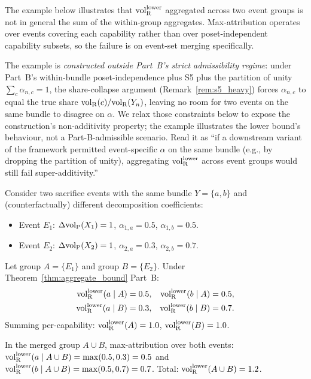 \begin{example}
\label{ex:m6_fail_volRlower}
The example below illustrates that ${\operatorname{vol}_{\mathrm{R}}^{\mathrm{lower}}}$ aggregated
across two event groups is not in general the sum of the
within-group aggregates.  Max-attribution operates over events
covering each capability rather than over poset-independent
capability subsets, so the failure is on event-set merging
specifically.

The example is \emph{constructed outside Part~B's strict
admissibility regime}: under Part~B's within-bundle
poset-independence plus S5 plus the partition of unity
$\sum_c \alpha_{n,c} = 1$, the share-collapse argument
(Remark~\ref{rem:s5_heavy}) forces $\alpha_{n,c}$ to equal the
true share ${\operatorname{vol}_{\mathrm{R}}}(c)/{\operatorname{vol}_{\mathrm{R}}}(Y_n)$, leaving no room for two
events on the same bundle to disagree on $\alpha$.  We relax
those constraints below to expose the construction's
non-additivity property; the example illustrates the lower
bound's behaviour, not a Part-B-admissible scenario.  Read it
as ``if a downstream variant of the framework permitted
event-specific $\alpha$ on the same bundle (e.g., by dropping
the partition of unity), aggregating ${\operatorname{vol}_{\mathrm{R}}^{\mathrm{lower}}}$ across event
groups would still fail super-additivity.''

Consider two sacrifice events with the same bundle
$Y = \{a, b\}$ and (counterfactually) different decomposition
coefficients:
\begin{itemize}
\item Event $E_1$: $\Delta{\operatorname{vol}_{\mathrm{P}}}(X_1) = 1$, $\alpha_{1,a} = 0.5$,
  $\alpha_{1,b} = 0.5$.
\item Event $E_2$: $\Delta{\operatorname{vol}_{\mathrm{P}}}(X_2) = 1$, $\alpha_{2,a} = 0.3$,
  $\alpha_{2,b} = 0.7$.
\end{itemize}
Let group $A = \{E_1\}$ and group $B = \{E_2\}$.  Under
Theorem~\ref{thm:aggregate_bound} Part~B:
\begin{align*}
  {\operatorname{vol}_{\mathrm{R}}^{\mathrm{lower}}}(a \mid A) &= 0.5, &
  {\operatorname{vol}_{\mathrm{R}}^{\mathrm{lower}}}(b \mid A) &= 0.5, \\
  {\operatorname{vol}_{\mathrm{R}}^{\mathrm{lower}}}(a \mid B) &= 0.3, &
  {\operatorname{vol}_{\mathrm{R}}^{\mathrm{lower}}}(b \mid B) &= 0.7.
\end{align*}
Summing per-capability:
${\operatorname{vol}_{\mathrm{R}}^{\mathrm{lower}}}(A) = 1.0$, ${\operatorname{vol}_{\mathrm{R}}^{\mathrm{lower}}}(B) = 1.0$.

In the merged group $A \cup B$, max-attribution over both events:
${\operatorname{vol}_{\mathrm{R}}^{\mathrm{lower}}}(a \mid A \cup B) = \max(0.5, 0.3) = 0.5$ and
${\operatorname{vol}_{\mathrm{R}}^{\mathrm{lower}}}(b \mid A \cup B) = \max(0.5, 0.7) = 0.7$.
Total: ${\operatorname{vol}_{\mathrm{R}}^{\mathrm{lower}}}(A \cup B) = 1.2$.


\end{example}
